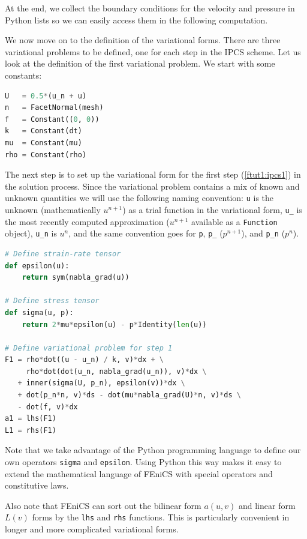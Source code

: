\documentclass[graybox,envcountchap,sectrefs,final]{svmonodo}
\begin{document}
At the end, we collect the boundary conditions for the velocity and
pressure in Python lists so we can easily access them in the
following computation.

We now move on to the definition of the variational forms. There are
three variational problems to be defined, one for each step in the
IPCS scheme. Let us look at the definition of the first variational
problem. We start with some constants:

\begin{lstlisting}[language=Python,style=graycolor]
U   = 0.5*(u_n + u)
n   = FacetNormal(mesh)
f   = Constant((0, 0))
k   = Constant(dt)
mu  = Constant(mu)
rho = Constant(rho)
\end{lstlisting}

The next step is to set up the variational form for the first step
(\ref{ftut1:ipcs1}) in the solution process.  Since the variational
problem contains a mix of known and unknown quantities we will use the
following naming convention: \texttt{u} is the unknown (mathematically
$u^{n+1}$) as a trial function in the variational form, \Verb!u_! is the
most recently computed approximation ($u^{n+1}$ available as a
\texttt{Function} object), \Verb!u_n! is $u^n$, and the same convention goes for
\texttt{p}, \Verb!p_! ($p^{n+1}$), and \Verb!p_n! ($p^n$).

\begin{lstlisting}[language=Python,style=graycolor]
# Define strain-rate tensor
def epsilon(u):
    return sym(nabla_grad(u))

# Define stress tensor
def sigma(u, p):
    return 2*mu*epsilon(u) - p*Identity(len(u))

# Define variational problem for step 1
F1 = rho*dot((u - u_n) / k, v)*dx + \
     rho*dot(dot(u_n, nabla_grad(u_n)), v)*dx \
   + inner(sigma(U, p_n), epsilon(v))*dx \
   + dot(p_n*n, v)*ds - dot(mu*nabla_grad(U)*n, v)*ds \
   - dot(f, v)*dx
a1 = lhs(F1)
L1 = rhs(F1)
\end{lstlisting}

Note that we take advantage of the Python programming language to
define our own operators \texttt{sigma} and \texttt{epsilon}. Using Python this way
makes it easy to extend the mathematical language of FEniCS with
special operators and constitutive laws.

Also note that FEniCS can sort out the bilinear form $a(u,v)$ and
linear form $L(v)$ forms by the \texttt{lhs}
and \texttt{rhs} functions. This is particularly convenient in longer and
more complicated variational forms.
\end{document}
